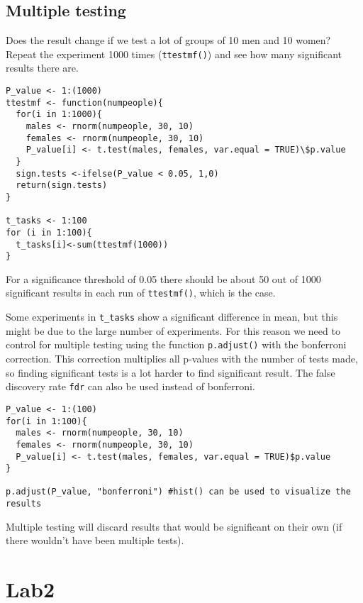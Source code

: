 \documentclass{article}
\theoremstyle{definition}
\begin{document}
\subsection{Multiple testing}
Does the result change if we test a lot of groups of 10 men and 10 women? Repeat the experiment 1000 times (\texttt{ttestmf()}) and see how many significant results there are. 
\begin{lstlisting}
P_value <- 1:(1000)
ttestmf <- function(numpeople){
  for(i in 1:1000){
    males <- rnorm(numpeople, 30, 10)
    females <- rnorm(numpeople, 30, 10)
    P_value[i] <- t.test(males, females, var.equal = TRUE)\$p.value
  }  
  sign.tests <-ifelse(P_value < 0.05, 1,0)
  return(sign.tests)
}

t_tasks <- 1:100
for (i in 1:100){
  t_tasks[i]<-sum(ttestmf(1000))
}
\end{lstlisting}
For a significance threshold of 0.05 there should be about 50 out of 1000 significant results in each run of \texttt{ttestmf()}, which is the case. \par 
Some experiments in \texttt{t\_tasks} show a significant difference in mean, but this might be due to the large number of experiments. For this reason we need to control for multiple testing using the function \texttt{p.adjust()} with the bonferroni correction. This correction multiplies all p-values with the number of tests made, so finding significant tests is a lot harder to find significant result. The false discovery rate \texttt{fdr} can also be used instead of bonferroni.
\begin{lstlisting}
P_value <- 1:(100)
for(i in 1:100){
  males <- rnorm(numpeople, 30, 10)
  females <- rnorm(numpeople, 30, 10)
  P_value[i] <- t.test(males, females, var.equal = TRUE)$p.value
}

p.adjust(P_value, "bonferroni") #hist() can be used to visualize the results
\end{lstlisting}

Multiple testing will discard results that would be significant on their own (if there wouldn't have been multiple tests).


\section{Lab2}
\end{document}
